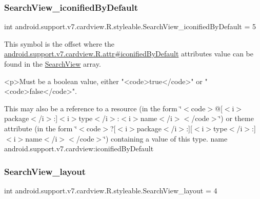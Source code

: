\subsubsection{\texorpdfstring{Search\+View\+\_\+iconified\+By\+Default}{SearchView\_iconifiedByDefault}}
{\footnotesize\ttfamily int android.\+support.\+v7.\+cardview.\+R.\+styleable.\+Search\+View\+\_\+iconified\+By\+Default = 5\hspace{0.3cm}{\ttfamily [static]}}

This symbol is the offset where the \hyperlink{classandroid_1_1support_1_1v7_1_1cardview_1_1R_1_1attr_ad2576cb78d3d6f4a5f43cedbd9214143}{android.\+support.\+v7.\+cardview.\+R.\+attr\#iconified\+By\+Default} attribute\textquotesingle{}s value can be found in the \hyperlink{classandroid_1_1support_1_1v7_1_1cardview_1_1R_1_1styleable_a6a300ecad88f70a7642265f73ff4d33f}{Search\+View} array.

\begin{DoxyVerb}      <p>Must be a boolean value, either "<code>true</code>" or "<code>false</code>".
\end{DoxyVerb}
 

This may also be a reference to a resource (in the form \char`\"{}$<$code$>$@\mbox{[}$<$i$>$package$<$/i$>$\+:\mbox{]}$<$i$>$type$<$/i$>$\+:$<$i$>$name$<$/i$>$$<$/code$>$\char`\"{}) or theme attribute (in the form \char`\"{}$<$code$>$?\mbox{[}$<$i$>$package$<$/i$>$\+:\mbox{]}\mbox{[}$<$i$>$type$<$/i$>$\+:\mbox{]}$<$i$>$name$<$/i$>$$<$/code$>$\char`\"{}) containing a value of this type.  name android.\+support.\+v7.\+cardview\+:iconified\+By\+Default \mbox{\label{classandroid_1_1support_1_1v7_1_1cardview_1_1R_1_1styleable_afaa092a1521b8271596ff81f5a983464}} 
\subsubsection{\texorpdfstring{Search\+View\+\_\+layout}{SearchView\_layout}}
{\footnotesize\ttfamily int android.\+support.\+v7.\+cardview.\+R.\+styleable.\+Search\+View\+\_\+layout = 4\hspace{0.3cm}{\ttfamily [static]}}


